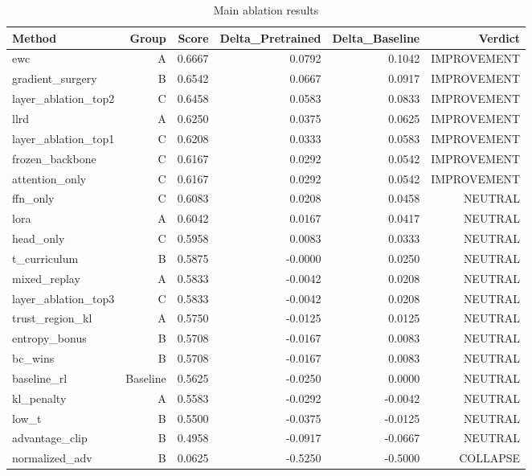 \begin{table}[htbp]
\centering
\caption{Main ablation results}
\label{tab:main-results}
\begin{tabular}{lrrrrr}
\toprule
\textbf{Method} & \textbf{Group} & \textbf{Score} & \textbf{Delta\_Pretrained} & \textbf{Delta\_Baseline} & \textbf{Verdict} \\
\midrule
ewc & A & 0.6667 & 0.0792 & 0.1042 & IMPROVEMENT \\
gradient\_surgery & B & 0.6542 & 0.0667 & 0.0917 & IMPROVEMENT \\
layer\_ablation\_top2 & C & 0.6458 & 0.0583 & 0.0833 & IMPROVEMENT \\
llrd & A & 0.6250 & 0.0375 & 0.0625 & IMPROVEMENT \\
layer\_ablation\_top1 & C & 0.6208 & 0.0333 & 0.0583 & IMPROVEMENT \\
frozen\_backbone & C & 0.6167 & 0.0292 & 0.0542 & IMPROVEMENT \\
attention\_only & C & 0.6167 & 0.0292 & 0.0542 & IMPROVEMENT \\
ffn\_only & C & 0.6083 & 0.0208 & 0.0458 & NEUTRAL \\
lora & A & 0.6042 & 0.0167 & 0.0417 & NEUTRAL \\
head\_only & C & 0.5958 & 0.0083 & 0.0333 & NEUTRAL \\
t\_curriculum & B & 0.5875 & -0.0000 & 0.0250 & NEUTRAL \\
mixed\_replay & A & 0.5833 & -0.0042 & 0.0208 & NEUTRAL \\
layer\_ablation\_top3 & C & 0.5833 & -0.0042 & 0.0208 & NEUTRAL \\
trust\_region\_kl & A & 0.5750 & -0.0125 & 0.0125 & NEUTRAL \\
entropy\_bonus & B & 0.5708 & -0.0167 & 0.0083 & NEUTRAL \\
bc\_wins & B & 0.5708 & -0.0167 & 0.0083 & NEUTRAL \\
baseline\_rl & Baseline & 0.5625 & -0.0250 & 0.0000 & NEUTRAL \\
kl\_penalty & A & 0.5583 & -0.0292 & -0.0042 & NEUTRAL \\
low\_t & B & 0.5500 & -0.0375 & -0.0125 & NEUTRAL \\
advantage\_clip & B & 0.4958 & -0.0917 & -0.0667 & NEUTRAL \\
normalized\_adv & B & 0.0625 & -0.5250 & -0.5000 & COLLAPSE \\
\bottomrule
\end{tabular}
\end{table}